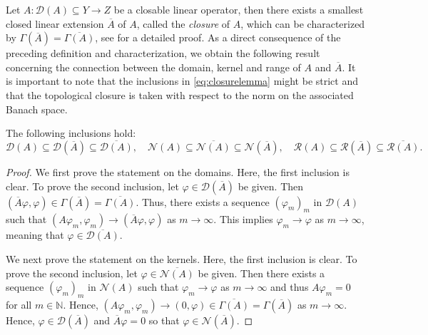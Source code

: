 \documentclass[english]{myarticle}
\begin{document}
\begin{sloppypar}
Let $A: \mathcal{D}(A) \subseteq Y \to Z$ be a closable linear operator, then there exists a smallest closed linear extension $\overline{A}$ of $A$, called the \emph{closure} of $A$, which can be characterized by $\Gamma(\overline{A}) = \overline{\Gamma(A)}$, see \cite[Proposition XIV.1.3]{Gohberg1990} for a detailed proof. As a direct consequence of the preceding definition and characterization, we obtain the following result concerning the connection between the domain, kernel and range of $A$ and $\overline{A}$. It is important to note that the inclusions in \eqref{eq:closurelemma} might be strict and that the topological closure is taken with respect to the norm on the associated Banach space.
\begin{lemma} \label{lemma:inclusions}
The following inclusions hold:
\begin{equation} \label{eq:closurelemma}
    \mathcal{D}(A) \subseteq \mathcal{D}(\overline{A}) \subseteq \overline{\mathcal{D}(A)}, \quad\mathcal{N}(A) \subseteq \overline{\mathcal{N}(A)} \subseteq \mathcal{N}(\overline{A}), \quad \mathcal{R}(A) \subseteq \mathcal{R}(\overline{A}) \subseteq \overline{\mathcal{R}(A)}.
\end{equation}
\end{lemma}
\begin{proof}
We first prove the statement on the domains. Here, the first inclusion is clear. To prove the second inclusion, let $\varphi \in \mathcal{D}(\overline{A})$ be given. Then $(\overline{A}\varphi,\varphi) \in \Gamma(\overline{A}) = \overline{\Gamma(A)}$. Thus, there exists a sequence $(\varphi_m)_m$ in $\mathcal{D}(A)$ such that $(A\varphi_m, \varphi_m) \to (\overline{A}\varphi, \varphi)$ as $m \to \infty$. This implies $\varphi_m \to \varphi$ as $m \to \infty$, meaning that $\varphi \in \overline{\mathcal{D}(A)}$.

We next prove the statement on the kernels. Here, the first inclusion is clear. To prove the second inclusion, let $\varphi \in \overline{\mathcal{N}(A)}$ be given. Then there exists a sequence $(\varphi_m)_m$ in $\mathcal{N}(A)$ such that $\varphi_m \to \varphi$ as $m \to \infty$ and thus $A\varphi_m = 0$ for all $m \in \mathbb{N}$. Hence, $(A\varphi_m,\varphi_m) \to (0,\varphi) \in \overline{\Gamma(A)} = \Gamma(\overline{A})$ as $m \to \infty$. Hence, $\varphi \in \mathcal{D}(\overline{A})$ and $\overline{A}\varphi = 0$ so that $\varphi \in \mathcal{N}(\overline{A})$.


\end{proof}
\end{sloppypar}
\end{document}

